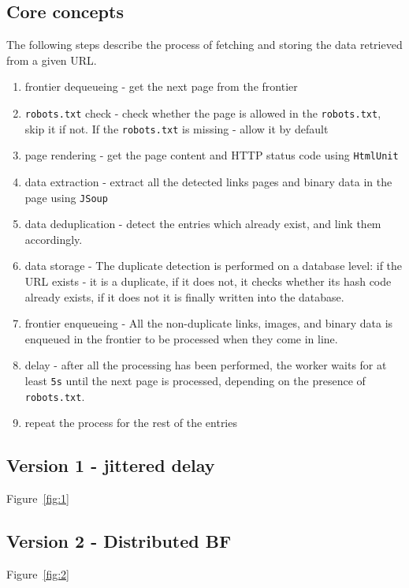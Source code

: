 \documentclass{article}
\begin{document}
\subsection{Core concepts}
The following steps describe the process of fetching and storing the data retrieved from a given URL.
\begin{enumerate}
	\item frontier dequeueing - get the next page from the frontier
	\item \texttt{robots.txt} check - check whether the page is allowed in the \texttt{robots.txt}, skip it if not. If the \texttt{robots.txt} is missing - allow it by default
	\item page rendering - get the page content and HTTP status code using \texttt{HtmlUnit}
	\item data extraction - extract all the detected links pages and binary data in the page using \texttt{JSoup}
	\item data deduplication - detect the entries which already exist, and link them accordingly. 
	\item data storage - The duplicate detection is performed on a database level: if the URL exists - it is a duplicate, if it does not, it checks whether its hash code already exists, if it does not it is finally written into the database.
	\item frontier enqueueing - All the non-duplicate links, images, and binary data is enqueued in the frontier to be processed when they come in line.
	\item delay - after all the processing has been performed, the worker waits for at least \texttt{5s} until the next page is processed, depending on the presence of \texttt{robots.txt}.
	\item repeat the process for the rest of the entries
\end{enumerate}

\subsection{Version 1 - jittered delay}

Figure~\ref{fig:1}


\subsection{Version 2 - Distributed BF}
Figure~\ref{fig:2}
\end{document}
